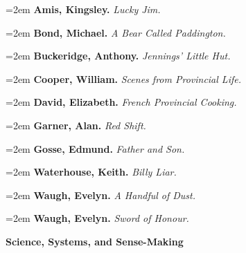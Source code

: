 \par\noindent\hangindent=2em {\bf Amis, Kingsley.} {\it Lucky Jim.} \par
\par\noindent\hangindent=2em {\bf Bond, Michael.} {\it A Bear Called Paddington.} \par
\par\noindent\hangindent=2em {\bf Buckeridge, Anthony.} {\it Jennings' Little Hut.} \par
\par\noindent\hangindent=2em {\bf Cooper, William.} {\it Scenes from Provincial Life.} \par
\par\noindent\hangindent=2em {\bf David, Elizabeth.} {\it French Provincial Cooking.} \par
\par\noindent\hangindent=2em {\bf Garner, Alan.} {\it Red Shift.} \par
\par\noindent\hangindent=2em {\bf Gosse, Edmund.} {\it Father and Son.} \par
\par\noindent\hangindent=2em {\bf Waterhouse, Keith.} {\it Billy Liar.} \par
\par\noindent\hangindent=2em {\bf Waugh, Evelyn.} {\it A Handful of Dust.} \par
\par\noindent\hangindent=2em {\bf Waugh, Evelyn.} {\it Sword of Honour.} \par

\bigskip
{\bf Science, Systems, and Sense-Making} \par\smallskip

